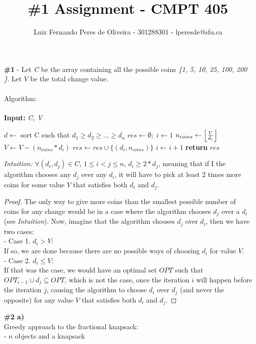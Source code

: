 \documentclass{article}
\title{\#1 Assignment - CMPT 405}
\author{Luiz Fernando Peres de Oliveira - 301288301 - lperesde@sfu.ca}
\newcommand\tab[1][1cm]{\hspace*{#1}}
\DeclarePairedDelimiter\floor{\lfloor}{\rfloor}
\begin{document}
\maketitle

\textbf{\#1} - Let \textit{C} be the array containing all the possible coins \textit{\{1, 5, 10, 25, 100, 200 \}}. Let $V$ be the total change value.\\
\\
Algorithm:\\\\
\textbf{Input:} \textit{C, V}
\begin{algorithmic}
\State $d\gets$ sort C such that $d_1 \geq d_2 \geq ... \geq d_n$
\State $res \gets \emptyset;$  $i \gets 1$
    \State $n_{coins}\gets   \floor*{\frac{V}{d_i}}$
    \State $V \gets V - (n_{coins} * d_i)$
    \State $res \gets res \cup \{ (d_i, n_{coins}) \}$
\EndIf
\State $i \gets i + 1$
\EndWhile
\State \textbf{return} $res$\\
\end{algorithmic}
\textit{Intuition:} $\forall (d_i, d_j) \in C$, $1 \leq i < j \leq n$, $d_i \geq 2*d_j$, meaning that if I the algorithm chooses any $d_j$ over any $d_i$, it will have to pick at least 2 times more coins for some value $V$ that satisfies both $d_i$ and $d_j$.\\
\begin{proof}
The only way to give more coins than the smallest possible number of coins for any change would be in a case where the algorithm chooses $d_j$ over a $d_i$ (see \textit{Intuition}). Now, imagine that the algorithm chooses $d_j$ over $d_i$, then we have two cases:\\
- Case 1. $d_i > V$:\\
\tab If so, we are done because there are no possible ways of choosing $d_i$ for value $V$.\\
- Case 2. $d_i \leq V$:\\
\tab If that was the case, we would have an optimal set $OPT$ such that $OPT_{i-1} \cup d_j \subseteq OPT$, which is not the case, once the iteration $i$ will happen before the iteration $j$, causing the algorithm to choose $d_i$ over $d_j$ (and never the opposite) for any value $V$ that satisfies both $d_i$ and $d_j$.\qedhere
\end{proof}
\textbf{\#2 a)}\\
Greedy approach to the fractional knapsack:\\
- $n$ objects and a knapsack\\
\end{document}

